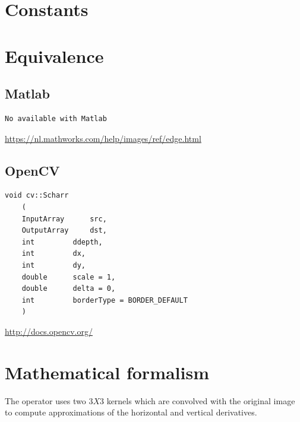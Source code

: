 \documentclass[12pt,a4paper]{article}
\begin{document}
\vspace{0.5cm}

\section*{Constants}


\newpage

\section*{Equivalence}
\subsection*{Matlab}

\lstset{language=Matlab}
\begin{lstlisting}
No available with Matlab
\end{lstlisting}

\url{https://nl.mathworks.com/help/images/ref/edge.html}


\subsection*{OpenCV}

\lstset{language=C++}
\begin{lstlisting}
void cv::Scharr 	
	(
	InputArray  	src,
	OutputArray  	dst,
	int  		ddepth,
	int  		dx,
	int  		dy,
	double  	scale = 1,
	double  	delta = 0,
	int  		borderType = BORDER_DEFAULT 
	) 		

\end{lstlisting}

\url{http://docs.opencv.org/}

\section*{Mathematical formalism}

The operator uses two $3X3$ kernels which are convolved with the original image to compute approximations of the horizontal and vertical derivatives. \\
\end{document}
